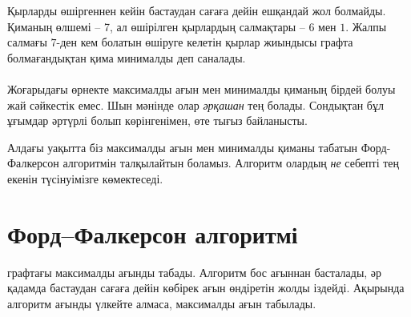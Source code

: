 \begin{center}
\end{center}

Қырларды өшіргеннен кейін бастаудан сағаға дейін
ешқандай жол болмайды. Қиманың өлшемі -- 7, ал өшірілген
қырлардың салмақтары -- $6$ мен $1$. Жалпы салмағы $7$-ден кем болатын өшіруге келетін қырлар жиындысы
графта болмағандықтан қима минималды деп саналады.
\\\\
Жоғарыдағы өрнекте максималды ағын 
мен минималды қиманың 
бірдей болуы жай сәйкестік емес. 
Шын мәнінде олар \emph{әрқашан} тең болады. 
Сондықтан бұл ұғымдар 
әртүрлі болып көрінгенімен, өте тығыз байланысты.

Алдағы уақытта біз максималды ағын мен
минималды қиманы табатын Форд-Фалкерсон 
алгоритмін талқылайтын боламыз. Алгоритм
олардың \emph{не} себепті тең екенін түсінуімізге 
көмектеседі. 

\section{Форд–Фалкерсон алгоритмі}


 \cite{for56} 
графтағы максималды ағынды табады. Алгоритм
бос ағыннан басталады, әр қадамда бастаудан 
сағаға дейін көбірек ағын өндіретін жолды іздейді.
Ақырында алгоритм ағынды үлкейте алмаса, 
максималды ағын табылады. 

